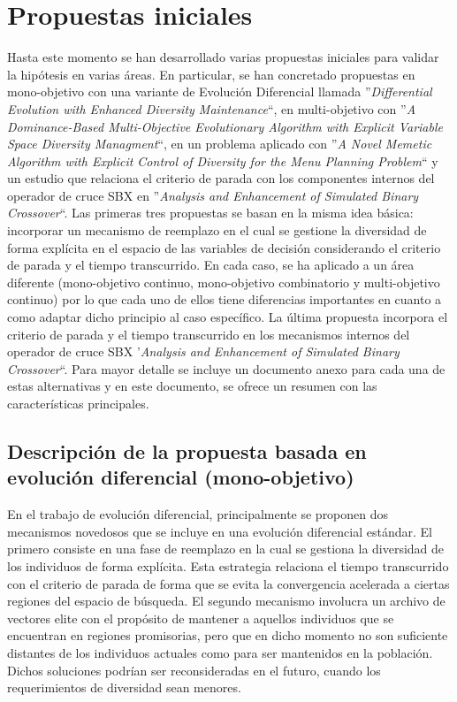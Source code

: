 \section{Propuestas iniciales}

Hasta este momento se han desarrollado varias propuestas iniciales para validar la hipótesis en varias áreas.
%
En particular, se han concretado propuestas en mono-objetivo con una variante de Evolución Diferencial llamada 
''\textit{Differential Evolution with Enhanced Diversity Maintenance}``, en multi-objetivo con 
''\textit{A Dominance-Based Multi-Objective Evolutionary Algorithm with Explicit Variable Space Diversity Managment}``, 
en un problema aplicado con ''\textit{A Novel Memetic Algorithm with Explicit Control of Diversity for the Menu Planning Problem}`` 
y un estudio que relaciona el criterio de parada con los componentes internos del operador de cruce SBX en 
''\textit{Analysis and Enhancement of Simulated Binary Crossover}``.
%
Las primeras tres propuestas se basan en la misma idea básica: incorporar un mecanismo de reemplazo en el cual se 
gestione la diversidad de forma explícita en el espacio de las variables de decisión considerando el criterio de parada y el 
tiempo transcurrido.
%
En cada caso, se ha aplicado a un área diferente (mono-objetivo continuo, mono-objetivo combinatorio y multi-objetivo continuo)
por lo que cada uno de ellos tiene diferencias importantes en cuanto a como adaptar dicho principio al caso específico.
%
La última propuesta incorpora el criterio de parada y el tiempo transcurrido en los mecanismos internos del operador de 
cruce SBX '\textit{Analysis and Enhancement of Simulated Binary Crossover}``.
%
Para mayor detalle se incluye un documento anexo para cada una de estas alternativas y en este documento, se ofrece
un resumen con las características principales.

\subsection{Descripción de la propuesta basada en evolución diferencial (mono-objetivo)}

En el trabajo de evolución diferencial, principalmente se proponen dos mecanismos novedosos que se incluye
en una evolución diferencial estándar.
%
El primero consiste en una fase de reemplazo en la cual se gestiona la diversidad de los individuos de forma explícita.
%
Esta estrategia relaciona el tiempo transcurrido con el criterio de parada de forma que se evita la convergencia acelerada 
a ciertas regiones del espacio de búsqueda.
%
El segundo mecanismo involucra un archivo de vectores elite con el propósito de mantener a aquellos individuos que 
se encuentran en regiones promisorias, pero que en dicho momento no son suficiente distantes de los individuos actuales como
para ser mantenidos en la población.
%
Dichos soluciones podrían ser reconsideradas en el futuro, cuando los requerimientos de diversidad sean menores.

